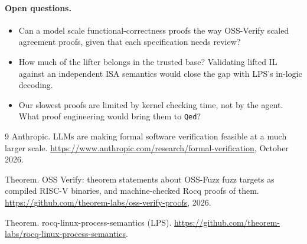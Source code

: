 \documentclass[11pt]{article}
\newcommand{\code}[1]{\texttt{#1}}
\begin{document}
\paragraph{Open questions.}
\begin{itemize}[nosep]
\item Can a model scale functional-correctness proofs the way OSS-Verify
      scaled agreement proofs, given that each specification needs review?
\item How much of the lifter belongs in the trusted base?  Validating
      lifted IL against an independent ISA semantics would close the gap
      with LPS's in-logic decoding.
\item Our slowest proofs are limited by kernel checking time, not by the
      agent.  What proof engineering would bring them to \code{Qed}?
\end{itemize}

\begin{thebibliography}{9}
Anthropic.
\newblock LLMs are making formal software verification feasible at a much
  larger scale.
\newblock \url{https://www.anthropic.com/research/formal-verification},
  October 2026.

Theorem.
\newblock OSS Verify: theorem statements about OSS-Fuzz fuzz targets as
  compiled RISC-V binaries, and machine-checked Rocq proofs of them.
\newblock \url{https://github.com/theorem-labs/oss-verify-proofs}, 2026.

Theorem.
\newblock rocq-linux-process-semantics (LPS).
\newblock
  \url{https://github.com/theorem-labs/rocq-linux-process-semantics}.
\end{thebibliography}
\end{document}
